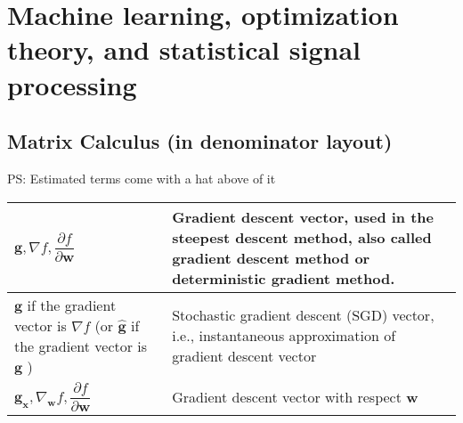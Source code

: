 \section{Machine learning, optimization theory, and \newline statistical signal processing}
\subsection{Matrix Calculus (in denominator layout)}
PS: Estimated terms come with a hat above of it
\begin{xltabular}{\textwidth}{XX}
	\(\mathbf{g}, \nabla f, \dfrac{\partial f}{\partial \mathbf{w}}\)                                                                                                                      & Gradient descent vector, used in the steepest descent method, also called gradient descent method or deterministic gradient method.                                                                                                                                                                                                                                                                                                        \\ \hline
	\(\mathbf{g}\) if the gradient vector is \(\nabla f\) (or \(\hat{\mathbf{g}}\) if the gradient vector is \(\mathbf{g}\) \cite{haykinNeuralNetworksLearning2009})                       & Stochastic gradient descent (SGD) vector, i.e., instantaneous approximation of gradient descent vector                                                                                                                                                                                                                                                                                                                                     \\ \hline
	\(\mathbf{g}_{\mathbf{x}}, \nabla_{\mathbf{w}}f, \dfrac{\partial f}{\partial \mathbf{w}}\)                                                                                             & Gradient descent vector with respect \(\mathbf{w}\) \cite{bishopPatternRecognitionMachine2006}                                                                                                                                                                                                                                                                                                                                             \\ \hline

\end{xltabular}
